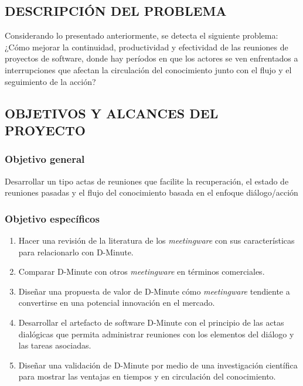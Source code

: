 \subsection{DESCRIPCIÓN DEL PROBLEMA}

Considerando lo presentado anteriormente, se detecta el siguiente problema: ¿Cómo mejorar la continuidad, productividad y efectividad de las reuniones de proyectos de software, donde hay períodos en que los actores se ven enfrentados a interrupciones que afectan la circulación del conocimiento junto con el flujo y el seguimiento de la acción?

\subsection{OBJETIVOS Y ALCANCES DEL PROYECTO}

\subsubsection{Objetivo general}

Desarrollar un tipo actas de reuniones que facilite la recuperación, el estado de reuniones pasadas y el flujo del conocimiento basada en el enfoque diálogo/acción

\subsubsection{Objetivo específicos}

\begin{enumerate}[1.]
    \item Hacer una revisión de la literatura de los \textit{meetingware} con sus características para relacionarlo con D-Minute.
    \item Comparar D-Minute con otros \textit{meetingware} en términos comerciales.
    \item Dise\~nar una propuesta de valor de D-Minute cómo \textit{meetingware} tendiente a convertirse en una potencial innovación en el mercado.
	\item Desarrollar el artefacto de software D-Minute con el principio de las actas dialógicas que permita administrar reuniones con los elementos del diálogo y las tareas asociadas.
	\item Dise\~nar una validación de D-Minute por medio de una investigación científica para mostrar las ventajas en tiempos y en circulación del conocimiento.
\end{enumerate}


